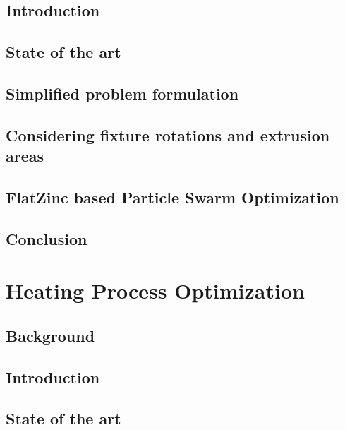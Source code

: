 \documentclass[12pt,a4paper,openright,twoside]{book}
\begin{document}
	\chapter{Introduction}
	
	
	\chapter{State of the art}
	
	
	\chapter{Simplified problem formulation}
	
	
	\chapter{Considering fixture rotations and extrusion areas}
	
	
	\chapter{FlatZinc based Particle Swarm Optimization}
	
	
	\chapter{Conclusion}
	
	
	\part{Heating Process Optimization}
	
	\chapter{Background}
	
	
	\chapter{Introduction}
	
	
	\chapter{State of the art}
	
	
\end{document}
